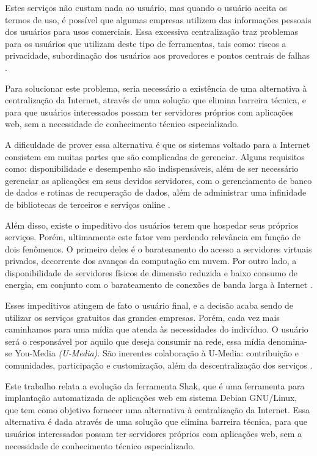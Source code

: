 Estes serviços não custam nada ao usuário, mas quando o usuário aceita os
termos de uso, é possível que algumas empresas utilizem das informações pessoais dos
usuários para usos comerciais. Essa excessiva centralização traz problemas para os usuários que utilizam deste tipo de ferramentas, tais como: riscos a privacidade, subordinação dos usuários
aos provedores e pontos centrais de falhas \cite{shak2015}. 

Para solucionar este problema, seria necessário a existência de uma alternativa à 
centralização da Internet, através de uma solução que elimina barreira técnica, e 
para que usuários interessados possam ter servidores próprios com aplicações web, 
sem a necessidade de conhecimento técnico especializado.

A dificuldade de prover essa alternativa é que os sistemas voltado para a
Internet consistem em muitas partes que são complicadas de gerenciar. Alguns
requisitos como: disponibilidade e desempenho são indispensáveis, além de ser
necessário gerenciar as aplicações em seus devidos servidores, com o gerenciamento de
banco de dados e rotinas de recuperação de dados, além de administrar uma
infinidade de bibliotecas de terceiros e serviços online \cite{6265084}.

Além disso, existe o impeditivo dos usuários terem que hospedar seus 
próprios serviços. Porém, ultimamente este fator vem perdendo relevância em função de
dois fenômenos. O primeiro deles é o barateamento do acesso a servidores virtuais
privados, decorrente dos avanços da computação em nuvem. Por outro lado, a
disponibilidade de servidores físicos de dimensão reduzida e baixo consumo de
energia, em conjunto com o barateamento de conexões de banda larga à Internet \cite{shak2015}.

Esses impeditivos atingem de fato o usuário final, e a decisão
acaba sendo de utilizar os serviços gratuitos das grandes empresas. Porém, 
cada vez mais caminhamos para uma mídia que atenda às necessidades do indivíduo. 
O usuário será o responsável por aquilo que deseja consumir na rede, essa mídia 
denomina-se You-Media \textit{(U-Media)}. São inerentes colaboração à U-Media: contribuição 
e comunidades, participação e customização, além da descentralização dos 
serviços \cite{terra2006comunicaccao}. 

Este trabalho relata a evolução da ferramenta Shak, que é uma ferramenta para implantação
automatizada de aplicações web em sistema Debian GNU/Linux, que tem como objetivo fornecer
uma alternativa à centralização da Internet. Essa alternativa é dada através de 
uma solução que elimina barreira técnica, para que usuários interessados possam 
ter servidores próprios com aplicações web, sem a necessidade de conhecimento técnico 
especializado. 

